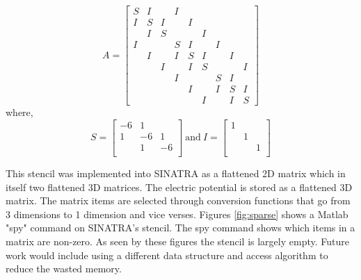 \begin{equation}
\label{eqn:stencil}
A = 
\begin{bmatrix}
S & I &  & I &  &  &  &  & \\ 
I & S &I  &  & I &  &  &  & \\ 
 & I & S &  &  &I  &  &  & \\ 
I &  &  & S & I &  &I &  & \\ 
 & I &  & I & S & I &  &I  & \\ 
 &  & I &  & I & S &  &  & I\\ 
 &  &  & I &  &  & S & I & \\ 
 &  &  &  & I &  & I & S & I\\ 
 &  &  &  &  & I &  & I & S
\end{bmatrix}
\end{equation}
where,
\begin{equation} \nonumber
S = 
\begin{bmatrix}
-6 & 1 & \\
1 & -6 & 1\\
 & 1 & -6 \\
\end{bmatrix}
\ \text{and} \ I = 
\begin{bmatrix}
1 &  & \\
 & 1 & \\
 & & 1 \\
\end{bmatrix}
\end{equation}

\indent This stencil was implemented into SINATRA as a flattened 2D matrix which in itself two flattened 3D matrices. The electric potential is stored as a flattened 3D matrix. The matrix items are selected through conversion functions that go from 3 dimensions to 1 dimension and vice verses. Figures \ref{fig:sparse} shows a Matlab "spy" command on SINATRA's stencil. The spy command shows which items in a matrix are non-zero. As seen by these figures the stencil is largely empty. Future work would include using a different data structure and access algorithm to reduce the wasted memory.  \par


